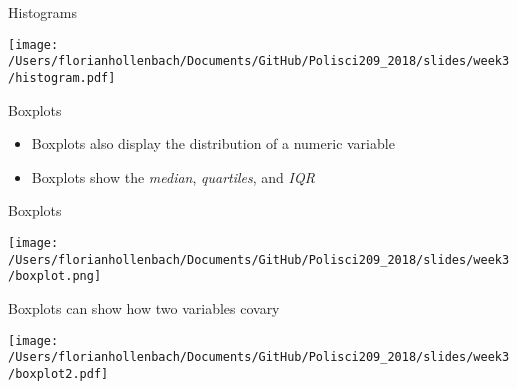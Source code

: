 \documentclass[presentation]{beamer}
\begin{document}
\begin{frame}[label={sec:orgbfc55cc}]{Histograms}
\begin{center}
\texttt{[image: /Users/florianhollenbach/Documents/GitHub/Polisci209\_2018/slides/week3/histogram.pdf]}
\end{center}
\end{frame}


\begin{frame}[label={sec:orgbf136f3}]{Boxplots}
\begin{itemize}
\item Boxplots also display the distribution of a numeric variable
\item Boxplots show the \emph{median}, \emph{quartiles}, and \emph{IQR}
\end{itemize}
\end{frame}

\begin{frame}[label={sec:orgb9ef12e}]{Boxplots}
\begin{center}
\texttt{[image: /Users/florianhollenbach/Documents/GitHub/Polisci209\_2018/slides/week3/boxplot.png]}
\end{center}
\end{frame}


\begin{frame}[label={sec:org3055d6c}]{Boxplots can show how two variables covary}
\begin{center}
\texttt{[image: /Users/florianhollenbach/Documents/GitHub/Polisci209\_2018/slides/week3/boxplot2.pdf]}
\end{center}
\end{frame}
\end{document}
